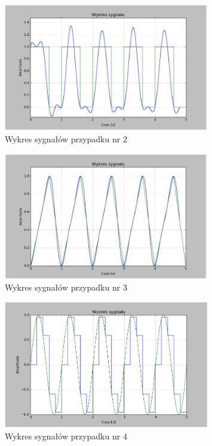 \documentclass{article}
\begin{document}
    \begin{figure}[h!]
        \centering
        \includegraphics[width=0.8\textwidth]{img/1/sinc_rec.png}
        \caption{Wykres sygnałów przypadku nr 2}
    \end{figure}
    \FloatBarrier

    \begin{figure}[h!]
        \centering
        \includegraphics[width=0.8\textwidth]{img/1/sinc_tri.png}
        \caption{Wykres sygnałów przypadku nr 3}
    \end{figure}
    \FloatBarrier

    \begin{figure}[h!]
        \centering
        \includegraphics[width=0.8\textwidth]{img/1/zoh5.png}
        \caption{Wykres sygnałów przypadku nr 4}
    \end{figure}
    \FloatBarrier
\end{document}
